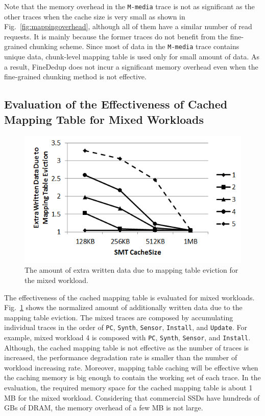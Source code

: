 Note that the memory overhead in the \texttt{M-media} trace is not as significant as the other
traces when the cache size is very small as shown in Fig.~\ref{fig:mappingoverhead},
although all of them have a similar number of read requests.
It is mainly because the former traces do not benefit from the fine-grained chunking scheme.
Since most of data in the \texttt{M-media} trace contains unique data,
chunk-level mapping table is used only for small amount of data.
As a result, FineDedup does not incur a significant memory overhead 
even when the fine-grained chunking method is not effective.



\subsection{Evaluation of the Effectiveness of Cached Mapping Table for Mixed Workloads}

\begin{figure}[t]
	\center
	\includegraphics[scale=0.45]{figure/finededup/evicteddata_result.png}
	\caption{The amount of extra written data due to mapping table eviction for the mixed workload.} %
	\label{fig:eviction_mixed}
\end{figure}

The effectiveness of the cached mapping table is evaluated for mixed workloads. 
Fig.~\ref{fig:eviction_mixed} shows the normalized amount of additionally written data due to the 
mapping table eviction. 
The mixed traces are composed by accumulating individual traces in the order of 
\texttt{PC}, \texttt{Synth}, \texttt{Sensor}, \texttt{Install}, and \texttt{Update}. 
For example, mixed workload 4 is composed with \texttt{PC}, \texttt{Synth}, \texttt{Sensor}, and \texttt{Install}.
Although, the cached mapping table is not effective as the number of traces is increased, 
the performance degradation rate is smaller than the number of workload increasing rate. 
Moreover, mapping table caching will be effective when the caching memory is big enough to contain 
the working set of each trace. 
In the evaluation, the required memory space for the cached mapping table is about 1 MB for the mixed workload. 
Considering that commercial SSDs have hundreds of GBs of DRAM, the memory overhead of a few MB is not large.


